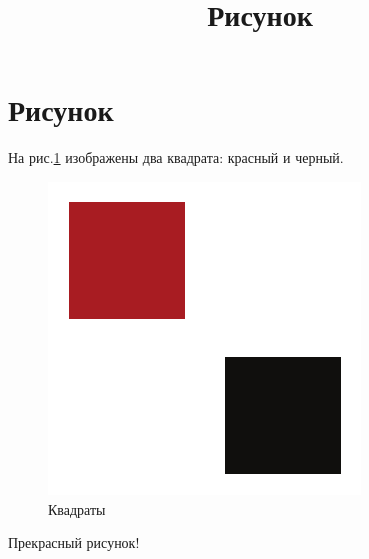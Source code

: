 \documentclass[a4paper,12pt]{article}
\title{Рисунок}
\begin{document}
\section*{Рисунок}

На рис.\ref{squares} изображены два квадрата: красный и черный.

\begin{figure}[bhtp]
\centering
\includegraphics{figure.pdf}
\caption{Квадраты}\label{squares}
\end{figure}

Прекрасный рисунок!
\end{document}
